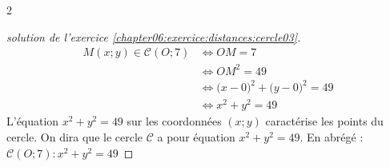 \documentclass[main.tex]{subfiles}
\begin{document}
\begin{multicols}{2}
\begin{proof}[solution de l'exercice \ref{chapter06:exercice:distances:cercle03}]       
	\begin{align*}
		M(x;y)\in \mathscr{C}(O;7) & \iff OM = 7 \\
		& \iff OM^2 = 49\\
		& \iff \big( x - 0 \big)^2 + \big( y - 0 \big)^2 =49 \\
		& \iff x^2 + y^2 =49 
	\end{align*} 
	L'équation $x^2 + y^2 =49$ sur les coordonnées $(x;y)$ caractérise les points du cercle.  On dira que le cercle $\mathscr{C}$ a pour équation $x^2 + y^2 =49$. En abrégé :$\mathscr{C}(O;7)\colon x^2 + y^2 =49$
\end{proof}
\end{multicols}

%	 
\cleardoublepage 
%	
\end{document}
